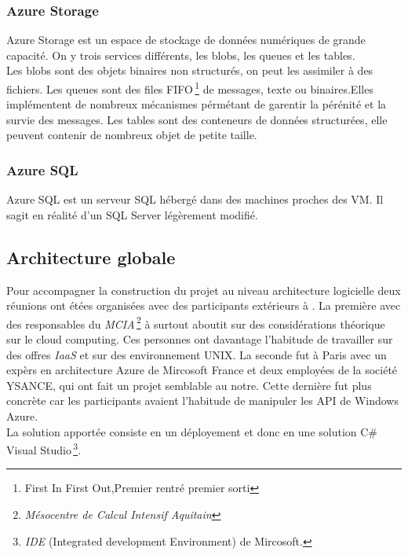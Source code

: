 \subsubsection{Azure Storage}
Azure Storage est un espace de stockage de données numériques de
grande capacité. On y trois services différents, les blobs, les queues et les tables.\\

Les blobs sont des objets binaires non structurés, on peut les
assimiler à des fichiers. Les queues sont des files
FIFO\,\footnote{{First In First Out},Premier rentré premier sorti} de
messages, texte ou binaires.Elles implémentent de nombreux mécanismes
pérmétant de garentir la pérénité et la survie des messages. Les
tables sont des conteneurs de données structurées, elle peuvent
contenir de nombreux objet de petite taille.\\



\subsubsection{Azure SQL}
Azure SQL est un serveur SQL hébergé dans des machines proches des
VM. Il sagit en réalité d'un SQL Server légèrement modifié.\\
%
%


\subsection{Architecture globale}
Pour accompagner la construction du projet au niveau architecture
logicielle deux réunions ont étées organisées avec des participants
extérieurs à \maxsea. La première avec des responsables du
\textit{MCIA}\,\footnote{\textit{Mésocentre de Calcul Intensif
    Aquitain}} à surtout aboutit sur des considérations théorique sur
le cloud computing. Ces personnes ont davantage l'habitude de
travailler sur des offres \textit{IaaS} et sur des environnement
UNIX. La seconde fut à Paris avec un expèrs en architecture Azure de
Mircosoft France et deux employées de la société YSANCE, qui ont fait
un projet semblable au notre. Cette dernière fut plus concrète car les
participants avaient l'habitude de manipuler les API de Windows
Azure. \\




La solution apportée consiste en un déployement et donc en une
solution C\# Visual Studio\,\footnote{\textit{IDE} (Integrated development
  Environment) de Mircosoft.}.




